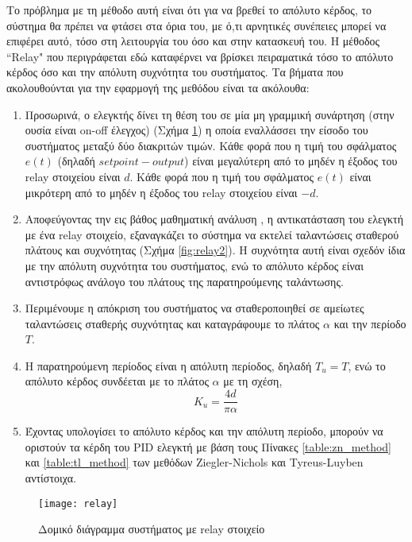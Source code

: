 Το πρόβλημα με τη μέθοδο αυτή είναι ότι για να βρεθεί το απόλυτο κέρδος, το σύστημα θα πρέπει να φτάσει στα όρια του, με ό,τι αρνητικές συνέπειες μπορεί να επιφέρει αυτό, τόσο στη λειτουργία του όσο και στην κατασκευή του. Η μέθοδος ``Relay" που περιγράφεται εδώ καταφέρνει να βρίσκει πειραματικά τόσο το απόλυτο κέρδος όσο και την απόλυτη συχνότητα του συστήματος. Τα βήματα που ακολουθούνται για την εφαρμογή της μεθόδου είναι τα ακόλουθα:
\begin{enumerate}

\item Προσωρινά, ο ελεγκτής δίνει τη θέση του σε μία μη γραμμική συνάρτηση (στην ουσία είναι on-off	έλεγχος) (Σχήμα \ref{fig:relay}) η οποία εναλλάσσει την είσοδο του συστήματος μεταξύ δύο διακριτών τιμών. Κάθε φορά που η τιμή του σφάλματος $e(t)$ (δηλαδή $setpoint - output$) είναι μεγαλύτερη από το μηδέν η έξοδος του relay στοιχείου είναι $d$. Κάθε φορά που η τιμή του σφάλματος $e(t)$ είναι μικρότερη από το μηδέν η έξοδος του relay στοιχείου είναι $-d$.

\item Αποφεύγοντας την εις βάθος μαθηματική ανάλυση \cite{astrom}, η αντικατάσταση του ελεγκτή με ένα relay στοιχείο, εξαναγκάζει το σύστημα να εκτελεί ταλαντώσεις σταθερού πλάτους και συχνότητας (Σχήμα \ref{fig:relay2}). Η συχνότητα αυτή είναι σχεδόν ίδια με την απόλυτη συχνότητα του συστήματος, ενώ το απόλυτο κέρδος είναι αντιστρόφως ανάλογο του πλάτους της παρατηρούμενης ταλάντωσης.

\item Περιμένουμε η απόκριση του συστήματος να σταθεροποιηθεί σε αμείωτες ταλαντώσεις σταθερής συχνότητας και καταγράφουμε το πλάτος $\alpha$ και την περίοδο $T$.
 
\item Η παρατηρούμενη περίοδος είναι η απόλυτη περίοδος, δηλαδή $T_u=T$, ενώ το απόλυτο κέρδος συνδέεται με το πλάτος $\alpha$ με τη σχέση,
\begin{equation}
K_u = \frac{4d}{\pi\alpha}
\label{eq:Ku}
\end{equation}

\item Έχοντας υπολογίσει το απόλυτο κέρδος και την απόλυτη περίοδο, μπορούν να οριστούν τα κέρδη του PID ελεγκτή με βάση τους Πίνακες \ref{table:zn_method} και \ref{table:tl_method} των μεθόδων Ziegler-Nichols και Tyreus-Luyben αντίστοιχα.

\end{enumerate}

\begin{figure}[h]
  \centering
  \texttt{[image: relay]}
  \caption{Δομικό διάγραμμα συστήματος με relay στοιχείο}
  \label{fig:relay}
\end{figure}



